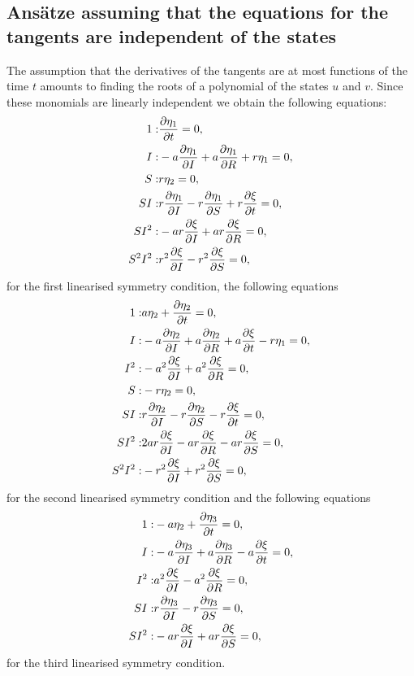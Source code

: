\subsection{Ans\"atze assuming that the equations for the tangents are independent of the states}
The assumption that the derivatives of the tangents are at most functions of the time $t$ amounts to finding the roots of a polynomial of the states $u$ and $v$. Since these monomials are linearly independent we obtain the following equations:
\begin{align}
1:&\pdv{\eta_1}{t}=0,\\
I:&- a \pdv{\eta_1}{I} + a \pdv{\eta_1}{R} + r\eta_1=0,\\
S:&r\eta_2=0,\\
S I:&r \pdv{\eta_1}{I} - r \pdv{\eta_1}{S} + r \pdv{\xi}{t}=0,\\
S I^{2}:&- a r \pdv{\xi}{I} + a r \pdv{\xi}{R}=0,\\
S^{2} I^{2}:&r^{2} \pdv{\xi}{I} - r^{2} \pdv{\xi}{S}=0,
\end{align}
for the first linearised symmetry condition, the following equations
\begin{align}
1:&a\eta_2 + \pdv{\eta_2}{t}=0,\\
I:&- a \pdv{\eta_2}{I} + a \pdv{\eta_2}{R} + a \pdv{\xi}{t} - r\eta_1=0,\\
I^{2}:&- a^{2} \pdv{\xi}{I} + a^{2} \pdv{\xi}{R}=0,\\
S:&- r\eta_2=0,\\
S I:&r \pdv{\eta_2}{I} - r \pdv{\eta_2}{S} - r \pdv{\xi}{t}=0,\\
S I^{2}:&2 a r \pdv{\xi}{I} - a r \pdv{\xi}{R} - a r \pdv{\xi}{S}=0,\\
S^{2} I^{2}:&- r^{2} \pdv{\xi}{I} + r^{2} \pdv{\xi}{S}=0,
\end{align}
for the second linearised symmetry condition and the following equations
\begin{align}
1:&- a\eta_2 + \pdv{\eta_3}{t}=0,\\
I:&- a \pdv{\eta_3}{I} + a \pdv{\eta_3}{R} - a \pdv{\xi}{t}=0,\\
I^{2}:&a^{2} \pdv{\xi}{I} - a^{2} \pdv{\xi}{R}=0,\\
S I:&r \pdv{\eta_3}{I} - r \pdv{\eta_3}{S}=0,\\
S I^{2}:&- a r \pdv{\xi}{I} + a r \pdv{\xi}{S}=0,
\end{align}
for the third linearised symmetry condition.